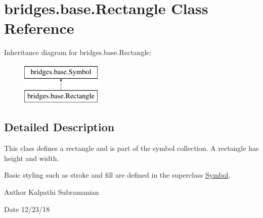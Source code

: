 \hypertarget{classbridges_1_1base_1_1_rectangle}{}\section{bridges.\+base.\+Rectangle Class Reference}
\label{classbridges_1_1base_1_1_rectangle}
Inheritance diagram for bridges.\+base.\+Rectangle\+:\begin{figure}[H]
\begin{center}
\leavevmode
\includegraphics[height=2.000000cm]{classbridges_1_1base_1_1_rectangle}
\end{center}
\end{figure}


\subsection{Detailed Description}
This class defines a rectangle and is part of the symbol collection. A rectangle has height and width. 

Basic styling such as stroke and fill are defined in the superclass \hyperlink{classbridges_1_1base_1_1_symbol}{Symbol}.

\begin{DoxyAuthor}{Author}
Kalpathi Subramanian 
\end{DoxyAuthor}
\begin{DoxyDate}{Date}
12/23/18 
\end{DoxyDate}

